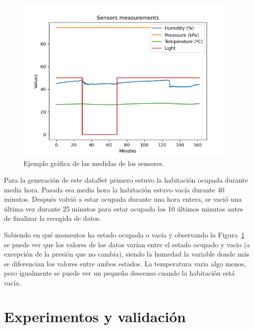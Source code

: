 \documentclass[a4paper, 12pt]{book}
\begin{document}
\begin{figure}[]
  \centering
  \includegraphics[width=11cm, keepaspectratio]{img/Data_occup_detec_2h_original.png}
  \caption{Ejemplo gráfica de las medidas de los sensores.}\label{fig:ejemplo_gráfica}
\end{figure}

Para la generación de este dataSet primero estuvo la habitación ocupada durante media hora. Pasada esa media hora la habitación estuvo vacía durante 40 minutos. Después volvió a estar ocupada durante una hora entera, se vació una última vez durante 25 minutos para estar ocupada los 10 últimos minutos antes de finalizar la recogida de datos.

Sabiendo en qué momentos ha estado ocupada o vacía y observando la Figura~\ref{fig:ejemplo_gráfica} se puede ver que los valores de los datos varían entre el estado ocupado y vacío (a excepción de la presión que no cambia), siendo la humedad la variable donde más se diferencian los valores entre ambos estados. La temperatura varia algo menos, pero igualmente se puede ver un pequeño descenso cuando la habitación está vacía. 

\cleardoublepage


\chapter{Experimentos y validación}
\label{chap:experimentos}
\end{document}
